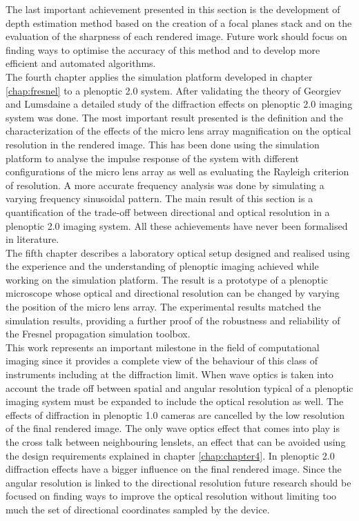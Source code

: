 The last important achievement presented in this section is the development of depth estimation method based on the creation of a focal planes stack and on the evaluation of the sharpness of each rendered image. Future work should focus on finding ways to optimise the accuracy of this method and to develop more efficient and automated algorithms.\\ 
The fourth chapter applies the simulation platform developed in chapter \ref{chap:fresnel} to a plenoptic 2.0 system. After validating the theory of Georgiev and Lumsdaine \cite{georgiev2010focused} a detailed study of the diffraction effects on plenoptic 2.0 imaging system was done. The most important result presented is the definition and the characterization of the effects of the micro lens array magnification on the optical resolution in the rendered image. This has been done using the simulation platform to analyse the impulse response of the system with different configurations of the micro lens array as well as evaluating the Rayleigh criterion of resolution. A more accurate frequency analysis was done by simulating a varying frequency sinusoidal pattern. The main result of this section is a quantification of the trade-off between directional and optical resolution in a plenoptic 2.0 imaging system. All these achievements have never been formalised in literature. \\
The fifth chapter describes a laboratory optical setup designed and realised using the experience and the understanding of plenoptic imaging achieved while working on the simulation platform. The result is a prototype of a plenoptic microscope whose optical and directional resolution can be changed by varying the position of the micro lens array. The experimental results matched the simulation results, providing a further proof of the robustness and reliability of the Fresnel propagation simulation toolbox.\\
This work represents an important milestone in the field of computational imaging since it provides a complete view of the behaviour of this class of instruments including at the diffraction limit. When wave optics is taken into account the trade off between spatial and angular resolution typical of a plenoptic imaging system must be expanded to include the optical resolution as well. The effects of diffraction in plenoptic 1.0 cameras are cancelled by the low resolution of the final rendered image. The only wave optics effect that comes into play is the cross talk between neighbouring lenslets, an effect that can be avoided using the design requirements explained in chapter \ref{chap:chapter4}. In plenoptic 2.0 diffraction effects have a bigger influence on the final rendered image. Since the angular resolution is linked to the directional resolution future research should be focused on finding ways to improve the optical resolution without limiting too much the set of directional coordinates sampled by the device. \\
